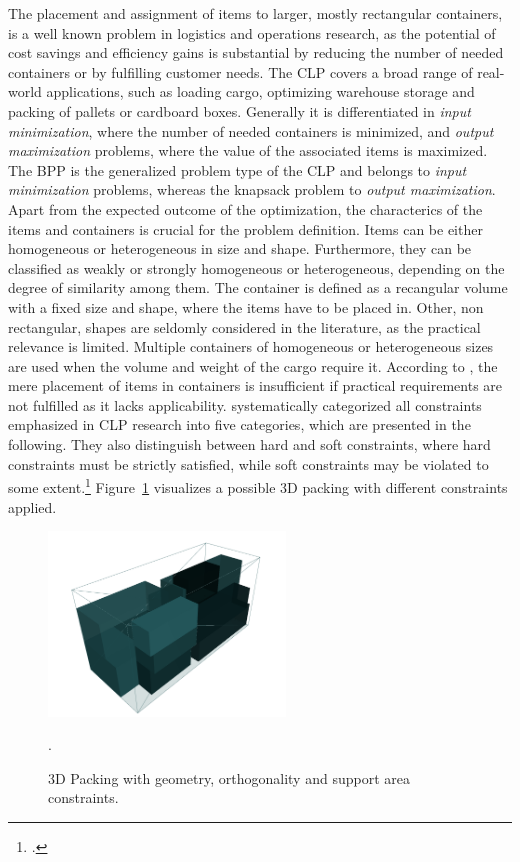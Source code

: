 The placement and assignment of items to larger, mostly rectangular
containers, is a well known problem in logistics and operations research, as the
potential of cost savings and efficiency gains is substantial by reducing the number
of needed containers or by fulfilling customer needs. The \gls{CLP} covers a broad range of real-world applications,
such as loading cargo, optimizing warehouse storage and packing of pallets or cardboard boxes.
Generally it is differentiated in \textit{input minimization},
where the number of needed containers is minimized, and \textit{output maximization} problems,
where the value of the associated items is maximized. The \gls{BPP} is the generalized problem type of the \gls{CLP}
and belongs to \textit{input minimization} problems, whereas the knapsack problem to \textit{output maximization}. Apart from the expected outcome of the optimization,
the characterics of the items and containers is crucial for the problem definition. Items can be either
homogeneous or heterogeneous in size and shape. Furthermore, they can be classified as weakly or strongly
homogeneous or heterogeneous, depending on the degree of similarity among them. The container is
defined as a recangular volume with a fixed size and shape, where the items have to be placed in.
Other, non rectangular, shapes are seldomly considered in the literature, as the practical relevance is
limited. Multiple containers of homogeneous or heterogeneous sizes are used when the volume and weight
of the cargo require it.
According to \textcite{bischoff_issues_1995}, the mere placement of items in containers is insufficient
if practical requirements are not fulfilled as it lacks applicability.
\textcite{bortfeldt_constraints_2013} systematically categorized all constraints emphasized in \gls{CLP} research
into five categories, which are presented in the following. They also distinguish between hard and soft constraints,
where hard constraints must be strictly satisfied, while soft constraints may be violated
to some extent.\footcites[cf.][pp. 1f]{bortfeldt_constraints_2013}[cf.][pp. 1--2]{bischoff_issues_1995}
Figure~\ref{fig:solution-visualization} visualizes a possible 3D packing with different constraints applied.

\begin{figure}[ht]
    \centering
    \includegraphics[width=6.3cm]{pictures/3l_cvrp_example.png}
    \caption[Visualized 3D packing with packing constraints.]{3D Packing with geometry, orthogonality and support area constraints.\footnotemark}.
    \label{fig:solution-visualization}
\end{figure}

